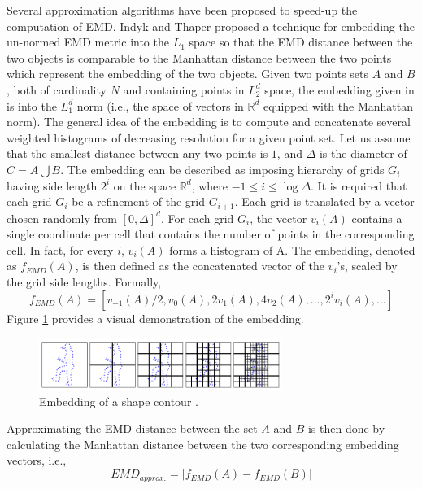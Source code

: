 \iftoggle{edit-mode}{\hspace{0pt}\marginpar{Indyk and Thaper Embedding}}{}
Several approximation algorithms have been proposed to speed-up the computation of EMD. 
Indyk and Thaper \cite{indyk2003fast} proposed a technique for embedding the un-normed EMD metric into the $L_1$ space so that the EMD distance between the two objects is comparable to the Manhattan distance between the two points which represent the embedding of the two objects.  
Given two points sets $A$ and $B$, both of cardinality $N$ and containing points in $L_2^d$ space, the embedding given in \cite{indyk2003fast} is into the $L_1^d$ norm (i.e., the space of vectors in $\mathds{R}^d$ equipped with the Manhattan norm).
The general idea of the embedding is to compute and concatenate several weighted histograms of decreasing resolution for a given point set. 
Let us assume that the smallest distance between any two points is $1$, and $\Delta$ is the diameter of $C=A \bigcup B$. 
The embedding can be described as imposing hierarchy of grids $G_i$ having side length $2^i$ on the space $\mathds{R}^d$, where $-1 \leq i \leq \log \Delta$. 
It is required that each grid $G_{i}$ be a refinement of the grid $G_{i+1}$. 
Each grid is translated by a vector chosen randomly from $[0, \Delta]^d$. 
For each grid $G_i$, the vector $v_i(A)$ contains a single coordinate per cell that contains the number of points in the corresponding cell. 
In fact, for every $i$, $v_i(A)$ forms a histogram of A. 
The embedding, denoted as $f_{EMD}(A)$, is then defined as the concatenated vector of the $v_i$'s, scaled by the grid side lengths. 
Formally,
\begin{equation}
f_{EMD}(A) = [v_{-1}(A)/2, v_0(A), 2v_1(A), 4v_2(A),..., 2^iv_i(A),...]
\end{equation} 
Figure \ref{fig:emd_embedding} provides a visual demonstration of the embedding.

\begin{figure}
\centering
\includegraphics[width=0.7\textwidth]{./figures/emd_embedding}       
\caption{Embedding of a shape contour \cite{grauman2004fast}.}
\label{fig:emd_embedding}
\end{figure}

Approximating the EMD distance between the set $A$ and $B$ is then done by calculating the Manhattan distance between the two corresponding embedding vectors, i.e.,
\begin{equation}
EMD_{approx.}=|f_{EMD}(A) - f_{EMD}(B)|
\end{equation}  

